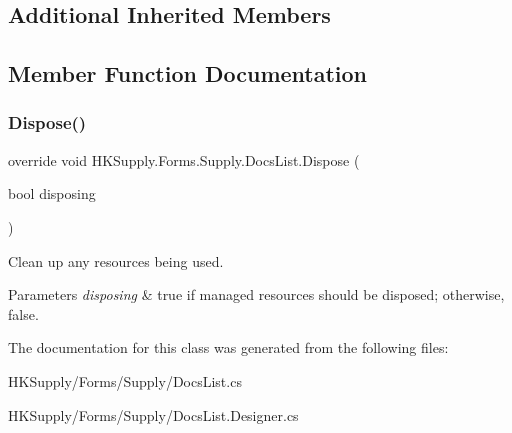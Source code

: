 \subsection*{Additional Inherited Members}


\subsection{Member Function Documentation}
\mbox{\label{class_h_k_supply_1_1_forms_1_1_supply_1_1_docs_list_a7e58528667abfc7010b73671ed97e2eb}} 
\subsubsection{\texorpdfstring{Dispose()}{Dispose()}}
{\footnotesize\ttfamily override void H\+K\+Supply.\+Forms.\+Supply.\+Docs\+List.\+Dispose (\begin{DoxyParamCaption}\item[{bool}]{disposing }\end{DoxyParamCaption})\hspace{0.3cm}{\ttfamily [protected]}}



Clean up any resources being used. 


\begin{DoxyParams}{Parameters}
{\em disposing} & true if managed resources should be disposed; otherwise, false.\\
\hline
\end{DoxyParams}


The documentation for this class was generated from the following files\+:\begin{DoxyCompactItemize}
\item 
H\+K\+Supply/\+Forms/\+Supply/Docs\+List.\+cs\item 
H\+K\+Supply/\+Forms/\+Supply/Docs\+List.\+Designer.\+cs\end{DoxyCompactItemize}
